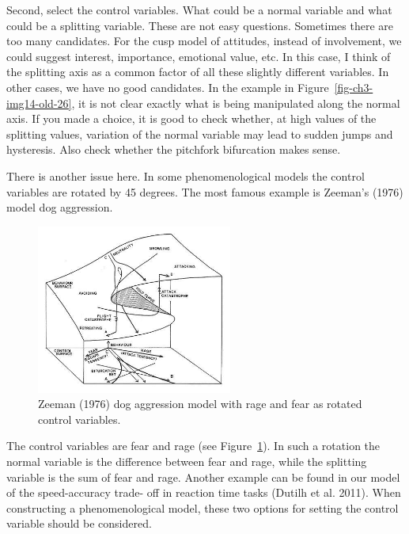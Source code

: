 \documentclass[
  letterpaper,
]{scrbook}
\begin{document}
Second, select the control variables. What could be a normal variable
and what could be a splitting variable. These are not easy questions.
Sometimes there are too many candidates. For the cusp model of
attitudes, instead of involvement, we could suggest interest,
importance, emotional value, etc. In this case, I think of the splitting
axis as a common factor of all these slightly different variables. In
other cases, we have no good candidates. In the example in
Figure~\ref{fig-ch3-img14-old-26}, it is not clear exactly what is being
manipulated along the normal axis. If you made a choice, it is good to
check whether, at high values of the splitting values, variation of the
normal variable may lead to sudden jumps and hysteresis. Also check
whether the pitchfork bifurcation makes sense.

There is another issue here. In some phenomenological models the control
variables are rotated by 45 degrees. The most famous example is Zeeman's
(1976) model dog aggression.

\begin{figure}

{\centering \includegraphics[width=2.53097in,height=\textheight]{media/ch3/image17.jpg}

}

\caption{\label{fig-ch3-img17-old-29}Zeeman (1976) dog aggression model
with rage and fear as rotated control variables.}

\end{figure}

The control variables are fear and rage (see
Figure~\ref{fig-ch3-img17-old-29}). In such a rotation the normal
variable is the difference between fear and rage, while the splitting
variable is the sum of fear and rage. Another example can be found in
our model of the speed-accuracy trade- off in reaction time tasks
(Dutilh et al. 2011). When constructing a phenomenological model, these
two options for setting the control variable should be considered.
\end{document}
